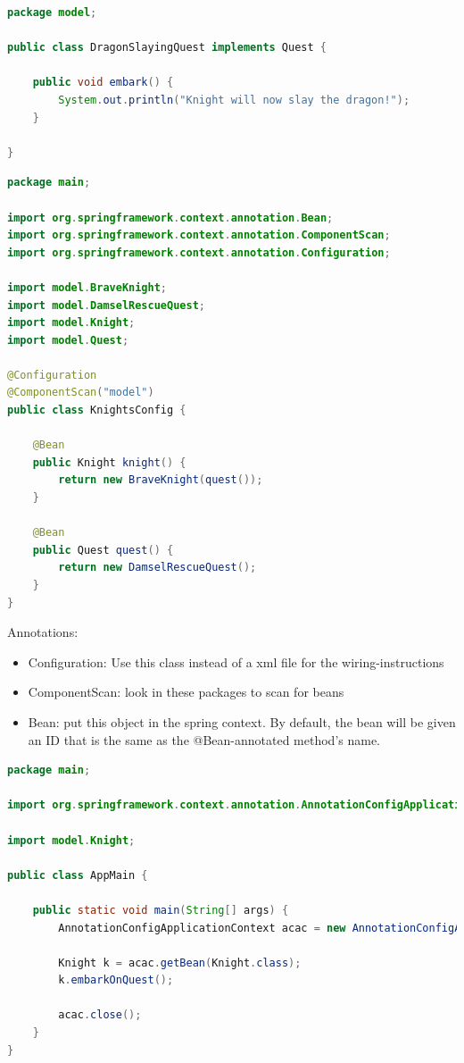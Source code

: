 \begin{lstlisting}[language=java]
package model;

public class DragonSlayingQuest implements Quest {

	public void embark() {
		System.out.println("Knight will now slay the dragon!");
	}

}

\end{lstlisting}

\begin{lstlisting}[language=java]
package main;

import org.springframework.context.annotation.Bean;
import org.springframework.context.annotation.ComponentScan;
import org.springframework.context.annotation.Configuration;

import model.BraveKnight;
import model.DamselRescueQuest;
import model.Knight;
import model.Quest;

@Configuration
@ComponentScan("model")
public class KnightsConfig {

	@Bean
	public Knight knight() {
		return new BraveKnight(quest());
	}
	
	@Bean
	public Quest quest() {
		return new DamselRescueQuest();
	}
}
\end{lstlisting}


Annotations: 
\begin{itemize}
    \item Configuration: Use this class instead of a xml file for the wiring-instructions
    \item ComponentScan: look in these packages to scan for beans
    \item Bean: put this object in the spring context. By default, the bean will be given an ID that is the same as the @Bean-annotated method’s name.
\end{itemize}

\begin{lstlisting}[language=java]
package main;

import org.springframework.context.annotation.AnnotationConfigApplicationContext;

import model.Knight;

public class AppMain {

	public static void main(String[] args) {
		AnnotationConfigApplicationContext acac = new AnnotationConfigApplicationContext(KnightsConfig.class);
		
		Knight k = acac.getBean(Knight.class);
		k.embarkOnQuest();
		
		acac.close();
	}
}
\end{lstlisting}


